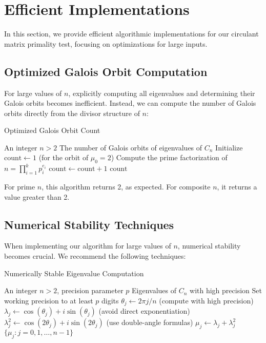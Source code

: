 \section{Efficient Implementations}

In this section, we provide efficient algorithmic implementations for our circulant matrix primality test, focusing on optimizations for large inputs.

\subsection{Optimized Galois Orbit Computation}

For large values of $n$, explicitly computing all eigenvalues and determining their Galois orbits becomes inefficient. Instead, we can compute the number of Galois orbits directly from the divisor structure of $n$:

\begin{algorithm}
\caption{Optimized Galois Orbit Count}
\begin{algorithmic}[1]
\REQUIRE An integer $n > 2$
\ENSURE The number of Galois orbits of eigenvalues of $C_n$
\STATE Initialize $\text{count} \gets 1$ (for the orbit of $\mu_0 = 2$)
\STATE Compute the prime factorization of $n = \prod_{i=1}^k p_i^{e_i}$
        \STATE $\text{count} \gets \text{count} + 1$
    \ENDIF
\ENDFOR
\RETURN $\text{count}$
\end{algorithmic}
\end{algorithm}

For prime $n$, this algorithm returns 2, as expected. For composite $n$, it returns a value greater than 2.

\subsection{Numerical Stability Techniques}

When implementing our algorithm for large values of $n$, numerical stability becomes crucial. We recommend the following techniques:

\begin{algorithm}
\caption{Numerically Stable Eigenvalue Computation}
\begin{algorithmic}[1]
\REQUIRE An integer $n > 2$, precision parameter $p$
\ENSURE Eigenvalues of $C_n$ with high precision
\STATE Set working precision to at least $p$ digits
    \STATE $\theta_j \gets 2\pi j/n$ (compute with high precision)
    \STATE $\lambda_j \gets \cos(\theta_j) + i \sin(\theta_j)$ (avoid direct exponentiation)
    \STATE $\lambda_j^2 \gets \cos(2\theta_j) + i \sin(2\theta_j)$ (use double-angle formulas)
    \STATE $\mu_j \gets \lambda_j + \lambda_j^2$
\ENDFOR
\RETURN $\{\mu_j : j = 0, 1, \ldots, n-1\}$
\end{algorithmic}
\end{algorithm}

